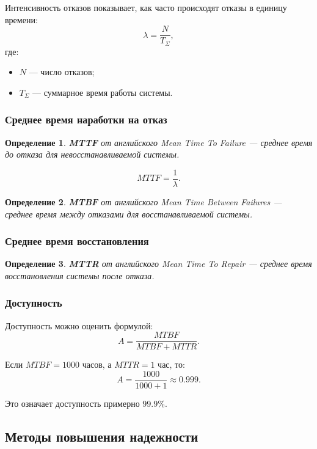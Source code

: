 \documentclass[12pt,a4paper]{article}
\newtheorem{definition}{Определение}
\begin{document}
Интенсивность отказов показывает, как часто происходят отказы в единицу времени:
\[
\lambda = \frac{N}{T_{\Sigma}},
\]
где:
\begin{itemize}
    \item $N$ --- число отказов;
    \item $T_{\Sigma}$ --- суммарное время работы системы.
\end{itemize}

\subsubsection{Среднее время наработки на отказ}

\begin{definition}
\textbf{MTTF} от английского \emph{Mean Time To Failure} --- среднее время до отказа для невосстанавливаемой системы.
\end{definition}

\[
MTTF = \frac{1}{\lambda}.
\]

\begin{definition}
\textbf{MTBF} от английского \emph{Mean Time Between Failures} --- среднее время между отказами для восстанавливаемой системы.
\end{definition}

\subsubsection{Среднее время восстановления}

\begin{definition}
\textbf{MTTR} от английского \emph{Mean Time To Repair} --- среднее время восстановления системы после отказа.
\end{definition}

\subsubsection{Доступность}

Доступность можно оценить формулой:
\[
A = \frac{MTBF}{MTBF + MTTR}.
\]

Если $MTBF = 1000$ часов, а $MTTR = 1$ час, то:
\[
A = \frac{1000}{1000 + 1} \approx 0.999.
\]

Это означает доступность примерно $99.9\%$.

\subsection{Методы повышения надежности}
\end{document}

